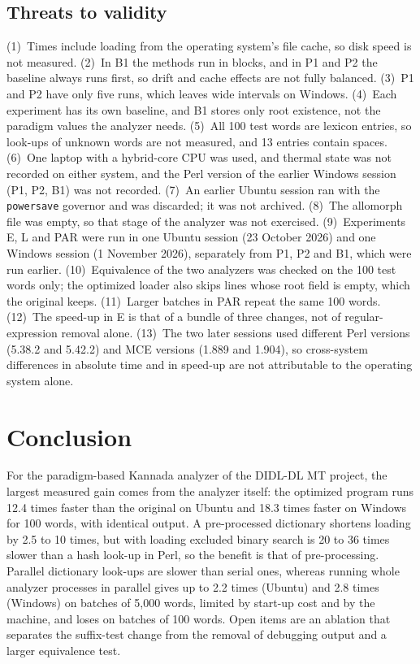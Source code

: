 \documentclass[conference]{IEEEtran}
\begin{document}
\subsection{Threats to validity}
(1)~Times include loading from the operating system's file cache, so disk speed is not measured. (2)~In B1 the methods run in blocks, and in P1 and P2 the baseline always runs first, so drift and cache effects are not fully balanced. (3)~P1 and P2 have only five runs, which leaves wide intervals on Windows. (4)~Each experiment has its own baseline, and B1 stores only root existence, not the paradigm values the analyzer needs. (5)~All 100 test words are lexicon entries, so look-ups of unknown words are not measured, and 13 entries contain spaces. (6)~One laptop with a hybrid-core CPU was used, and thermal state was not recorded on either system, and the Perl version of the earlier Windows session (P1, P2, B1) was not recorded. (7)~An earlier Ubuntu session ran with the \texttt{powersave} governor and was discarded; it was not archived. (8)~The allomorph file was empty, so that stage of the analyzer was not exercised. (9)~Experiments E, L and PAR were run in one Ubuntu session (23 October 2026) and one Windows session (1 November 2026), separately from P1, P2 and B1, which were run earlier. (10)~Equivalence of the two analyzers was checked on the 100 test words only; the optimized loader also skips lines whose root field is empty, which the original keeps. (11)~Larger batches in PAR repeat the same 100 words. (12)~The speed-up in E is that of a bundle of three changes, not of regular-expression removal alone. (13)~The two later sessions used different Perl versions (5.38.2 and 5.42.2) and MCE versions (1.889 and 1.904), so cross-system differences in absolute time and in speed-up are not attributable to the operating system alone.

\section{Conclusion}
For the paradigm-based Kannada analyzer of the DIDL-DL MT project, the largest measured gain comes from the analyzer itself: the optimized program runs 12.4 times faster than the original on Ubuntu and 18.3 times faster on Windows for 100 words, with identical output. A pre-processed dictionary shortens loading by 2.5 to 10 times, but with loading excluded binary search is 20 to 36 times slower than a hash look-up in Perl, so the benefit is that of pre-processing. Parallel dictionary look-ups are slower than serial ones, whereas running whole analyzer processes in parallel gives up to 2.2 times (Ubuntu) and 2.8 times (Windows) on batches of 5,000 words, limited by start-up cost and by the machine, and loses on batches of 100 words. Open items are an ablation that separates the suffix-test change from the removal of debugging output and a larger equivalence test.
\end{document}
